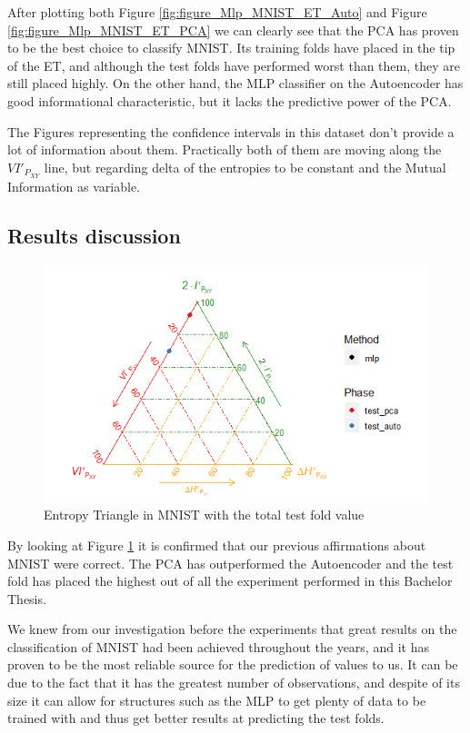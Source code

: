 After plotting both Figure \ref{fig:figure_Mlp_MNIST_ET_Auto} and Figure \ref{fig:figure_Mlp_MNIST_ET_PCA} we can clearly see that the PCA has proven to be the best choice to classify MNIST. Its training folds have placed in the tip of the ET, and although the test folds have performed worst than them, they are still placed highly. On the other hand, the MLP classifier on the Autoencoder has good informational characteristic, but it lacks the predictive power of the PCA.\par

The Figures representing the confidence intervals in this dataset don't provide a lot of information about them. Practically both of them are moving along the $VI'_{P_{XY}}$ line, but regarding delta of the entropies to be constant and the Mutual Information as variable.\par

\subsection{Results discussion} 

\begin{figure}[H]
	\centering
	\includegraphics[width=1\linewidth]{Figuras_tfg/MNIST_performance_test}
	\caption{Entropy Triangle in MNIST with the total test fold value}
	\label{fig:figure_Total_MNIST_ET}
\end{figure}

By looking at Figure \ref{fig:figure_Total_MNIST_ET} it is confirmed that our previous affirmations about MNIST were correct. The PCA has outperformed the Autoencoder and the test fold has placed the highest out of all the experiment performed in this Bachelor Thesis. \par

We knew from our investigation before the experiments that great results on the classification of MNIST had been achieved throughout the years, and it has proven to be the most reliable source for the prediction of values to us. It can be due to the fact that it has the greatest number of observations, and despite of its size it can allow for structures such as the MLP to get plenty of data to be trained with and thus get better results at predicting the test folds. \par


